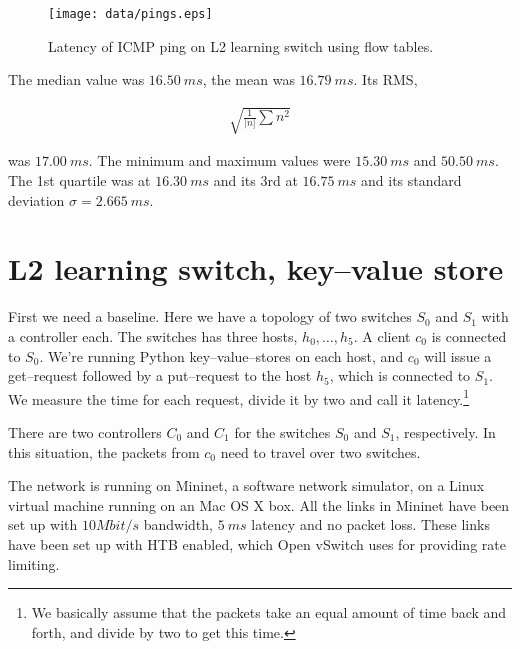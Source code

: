 \begin{figure}
  \centering
  \texttt{[image: data/pings.eps]}
  \caption{Latency of ICMP ping on L2 learning switch using flow tables.}
  \label{benchmark:l2.learning.switch.ping}
\end{figure}

The median value was $16.50~ms$, the mean was $16.79~ms$.
Its \ac{RMS},

\begin{gather}
  \sqrt{\frac{1}{|n]}\sum{n^2}}
  \label{equation:rms}
\end{gather}

was $17.00~ms$.
The minimum and maximum values were $15.30~ms$ and $50.50~ms$.
The 1st quartile was at $16.30~ms$ and its 3rd at $16.75~ms$ and its standard
deviation $\sigma = 2.665~ms$.


\section{L2 learning switch, key--value store}
\label{chapter:benchmark.l2.kv.noflows}

First we need a baseline.  Here we have a topology of two switches $S_0$ and
$S_1$ with a controller each.  The switches has three hosts, $h_0, \dots, h_5$.
A client $c_0$ is connected to $S_0$. We're running Python
key--value--stores on each host, and $c_0$ will issue a get--request
followed by a put--request to the host $h_5$, which is connected to $S_1$.
We measure the time for each request, divide it
by two and call it latency.\footnote{We basically assume that the packets
take an equal amount of time back and forth, and divide by two to get this
time.}

There are two controllers $C_0$ and $C_1$ for the switches $S_0$ and $S_1$,
respectively.  In this situation, the packets from $c_0$ need to travel
over two switches.

The network is running on Mininet, a software network simulator, on a Linux
virtual machine running on an Mac OS X box.  All the links in Mininet have
been set up with $10 Mbit/s$ bandwidth, $5~ms$ latency and no packet
loss.  These links have been set up with \ac{HTB}
\cite{devera2002hierarchical} enabled, which Open vSwitch
 uses for providing rate limiting.

